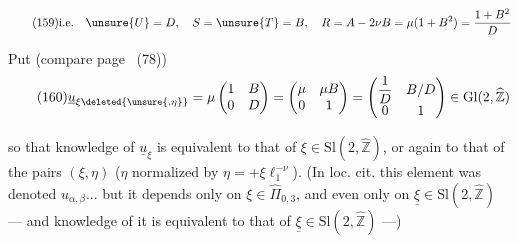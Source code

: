 
\[
\tag{159}
\text{i.e.}\quad
\unsure{U}=D,\quad S=\unsure{T}=B,\quad
R=A-2\nu B=\mu(1+B^2)=\frac{1+B^2}{D}
\]

Put (compare page~ (78))
\[
\tag{160}
\underline u_{\xi\deleted{\unsure{,\eta}}}
=\mu\begin{pmatrix}1&B\\0&D\end{pmatrix}
=\begin{pmatrix}\mu&\mu B\\0&1\end{pmatrix}
=\begin{pmatrix}\dfrac1D&B/D\\0&1\end{pmatrix}
\in\mathrm{Gl}(2,\widehat{\mathbb Z})
\]


so that knowledge of $\underline u_\xi$ is equivalent to that  of $\xi\in\mathrm{Sl}(2,\widehat{\mathbb Z})$, or again to that of the pairs $(\xi,\eta)$ ($\eta$ normalized by $\eta=+\xi\ell_1^{-\nu}$). (In loc. cit. this element was denoted $u_{\alpha,\beta}$... but it depends only on $\xi\in\widehat{\Pi}_{0,3}$, and even only on $\underline\xi\in\mathrm{Sl}(2,\widehat{\mathbb Z})$ --- and knowledge of it is equivalent to that of $\underline\xi\in\mathrm{Sl}(2,\widehat{\mathbb Z})$ ---)




